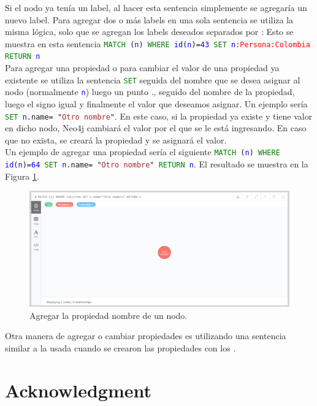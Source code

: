 \documentclass[conference]{IEEEtran}
\begin{document}
Si el nodo ya tenía un label, al hacer esta sentencia simplemente se agregaría un nuevo label. Para agregar dos o más labels en una sola sentencia se utiliza la misma lógica, solo que se agregan los labels deseados separados por : Esto se muestra en esta sentencia \texttt{\textcolor{green}{MATCH} (\textcolor{blue}{n}) \textcolor{green}{WHERE} \textcolor{blue}{id}(\textcolor{blue}{n})=\textcolor{blue}{43} \textcolor{green}{SET} \textcolor{blue}{n}\textcolor{red}{:Persona:Colombia} \textcolor{green}{RETURN} \textcolor{blue}{n}}
\\
Para agregar una propiedad o para cambiar el valor de una propiedad ya existente se utiliza la sentencia \texttt{\textcolor{green}{SET}} seguida del nombre que se desea asignar al nodo (normalmente \texttt{\textcolor{blue}{n}}) luego un punto ., seguido del nombre de la propiedad, luego el signo igual y finalmente el valor que deseamos asignar. Un ejemplo sería \texttt{\textcolor{green}{SET} \textcolor{blue}{n}.name= "\textcolor{brown}{Otro nombre}"}. En este caso, si la propiedad ya existe y tiene valor en dicho nodo, Neo4j cambiará el valor por el que se le está ingresando. En caso que no exista, se creará la propiedad y se asignará el valor. 
\\
Un ejemplo de agregar una propiedad sería el siguiente \texttt{\textcolor{green}{MATCH} (\textcolor{blue}{n}) \textcolor{green}{WHERE} \textcolor{blue}{id}(\textcolor{blue}{n})=\textcolor{blue}{64} \textcolor{green}{SET} \textcolor{blue}{n}.name= "\textcolor{brown}{Otro nombre}"  \textcolor{green}{RETURN} \textcolor{blue}{n}}. El resultado se muestra en la Figura \ref{fig28}.


\begin{figure}[H]
\begin{center}
\includegraphics[width= 0.45 \textwidth]{set_nombre1.png}
\end{center}
\caption{Agregar la propiedad nombre de un nodo.}
\label{fig28}
\end{figure}

Otra manera de agregar o cambiar propiedades es utilizando una sentencia similar a la usada cuando se crearon las propiedades con los { }. 

\section*{Acknowledgment}
\end{document}
